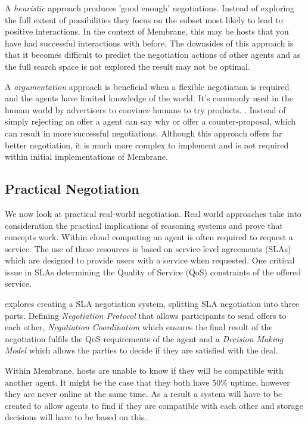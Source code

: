 \documentclass[a4paper, 11pt, twocolumn, twoside]{report}
\begin{document}
A \emph{heuristic} approach produces 'good enough' negotiations. Instead of exploring the full extent of possibilities they focus on the subset most likely to lead to positive interactions. In the context of Membrane, this may be hosts that you have had successful interactions with before. The downsides of this approach is that it becomes difficult to predict the negotiation actions of other agents and as the full search space is not explored the result may not be optimal. \citep{jennings2001automated}

A \emph{argumentation} approach is beneficial when a flexible negotiation is required and the agents have limited knowledge of the world. It's commonly used in the human world by advertisers to convince humans to try products. \citep{slade2002reasons}. Instead of simply rejecting an offer a agent can say why or offer a counter-proposal, which can result in more successful negotiations. Although this approach offers far better negotiation, it is much more complex to implement and is not required within initial implementations of Membrane.

\subsection{Practical Negotiation}

We now look at practical real-world negotiation. Real world approaches take into consideration the practical implications of reasoning systems and prove that concepts work. Within cloud computing an agent is often required to request a service. The use of these resources is based on service-level agreements (SLAs) which are designed to provide users with a service when requested. \citep{paletta2009mas} One critical issue in SLAs determining the  Quality of Service (QoS) constraints of the offered service.

\cite{yan2007autonomous} explores creating a SLA negotiation system, splitting SLA negotiation into three parts. Defining \emph{Negotiation Protocol} that allows participants to send offers to each other, \emph{Negotiation Coordination} which ensures the final result of the negotiation fulfils the QoS requirements of the agent and a \emph{Decision Making Model} which allows the parties to decide if they are satisfied with the deal.

Within Membrane, hosts are unable to know if they will be compatible with another agent. It might be the case that they both have 50\% uptime, however they are never online at the same time. As a result a system will have to be created to allow agents to find if they are compatible with each other and storage decisions will have to be based on this.
\end{document}
